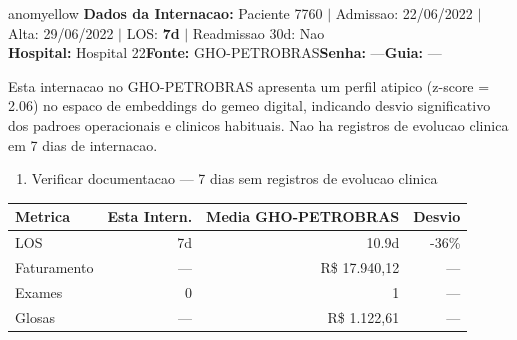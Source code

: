 \documentclass[a4paper,10pt]{article}
\begin{document}
\begin{anomalycard}[Internacao 7737 | GHO-PETROBRAS | MODERADO (z=2.06)]{anomyellow}
\textbf{Dados da Internacao:} Paciente 7760 $\mid$ Admissao: 22/06/2022 $\mid$ Alta: 29/06/2022 $\mid$ LOS: \textbf{7d} $\mid$ Readmissao 30d: Nao\\
\textbf{Hospital:} Hospital 22\quad\textbf{Fonte:} GHO-PETROBRAS\quad\textbf{Senha:} ---\quad\textbf{Guia:} ---\\
\vspace{2pt}\begin{tcolorbox}[colback=severityred!20,colframe=anomyellow,title={\textbf{Interpretacao de Negocio}},fonttitle=\bfseries\small,left=4pt,right=4pt,top=3pt,bottom=3pt]
{\small Esta internacao no GHO-PETROBRAS apresenta um perfil atipico (z-score = 2.06) no espaco de embeddings do gemeo digital, indicando desvio significativo dos padroes operacionais e clinicos habituais. Nao ha registros de evolucao clinica em 7 dias de internacao.}
\end{tcolorbox}
\begin{tcolorbox}[colback=severityyellow!30,colframe=anomorange,title={\textbf{Recomendacoes Especificas}},fonttitle=\bfseries\small,left=4pt,right=4pt,top=3pt,bottom=3pt]
\begin{enumerate}[nosep,leftmargin=16pt]
\item {\small Verificar documentacao --- 7 dias sem registros de evolucao clinica}
\end{enumerate}
\end{tcolorbox}
\begin{center}\begin{tabular}{l r r r}\toprule\textbf{Metrica} & \textbf{Esta Intern.} & \textbf{Media GHO-PETROBRAS} & \textbf{Desvio} \\\midrule
LOS & 7d & 10.9d & -36\% \\
Faturamento & --- & R\$ 17.940,12 & --- \\
Exames & 0 & 1 & --- \\
Glosas & --- & R\$ 1.122,61 & --- \\
\bottomrule\end{tabular}\end{center}


\end{anomalycard}
\end{document}
